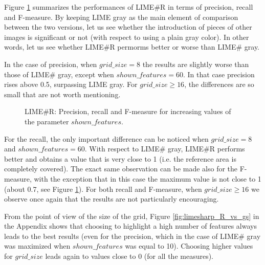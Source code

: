 \documentclass[12pt, twoside, a4paper]{report}
\begin{document}
Figure \ref{subfig:limesharp_R_vs_sf} summarizes the performances of LIME\#R in terms of precision, recall and F-measure. 
By keeping LIME gray as the main element of comparison between the two versions, let us see whether the introduction of pieces of other images is significant or not (with respect to using a plain gray color). In other words, let us see whether LIME\#R permorms better or worse than LIME\# gray.

In the case of precision, when $grid\_size = 8$ the results are slightly worse than those of LIME\# gray, except when $shown\_features = 60$. In that case precision rises above 0.5, surpassing LIME gray. For $grid\_size \geq 16$, the differences are so small that are not worth mentioning.

\begin{figure}
\centering
{}
\caption{LIME\#R: Precision, recall and F-measure for increasing values of the parameter $shown\_features$.}
\label{subfig:limesharp_R_vs_sf}
\end{figure}

For the recall, the only important difference can be noticed when $grid\_size = 8$ and $shown\_features = 60$. With respect to LIME\# gray, LIME\#R performs better and obtains a value that is very close to 1 (i.e. the reference area is completely covered). The exact same observation can be made also for the F-measure, with the exception that in this case the maximum value is not close to 1 (about 0.7, see Figure \ref{subfig:limesharp_R_vs_sf}).
For both recall and F-measure, when $grid\_size \geq 16$ we observe once again that the results are not particularly encouraging.
\bigskip

From the point of view of the size of the grid, Figure \ref{fig:limesharp_R_vs_gs} in the Appendix shows that choosing to highlight a high number of features always leads to the best results (even for the precision, which in the case of LIME\# gray was maximized when $shown\_features$ was equal to 10). 
Choosing higher values for $grid\_size$ leads again to values close to 0 (for all the measures).
\end{document}
